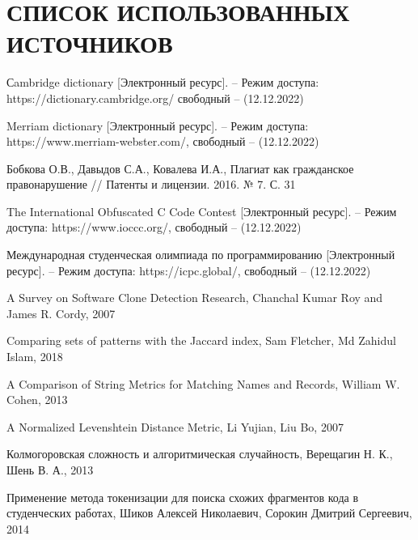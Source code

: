 \section*{СПИСОК ИСПОЛЬЗОВАННЫХ ИСТОЧНИКОВ}

\begingroup
\renewcommand{\section}[2]{}
\begin{thebibliography}{}
	
	
	Сambridge dictionary  [Электронный ресурс]. -- Режим доступа: 
	https://dictionary.cambridge.org/
	свободный -- (12.12.2022)
	
	Merriam dictionary [Электронный ресурс]. -- Режим доступа: 
	https://www.merriam-webster.com/,
	свободный -- (12.12.2022)
	
	Бобкова О.В., Давыдов С.А., Ковалева И.А., 
	Плагиат как гражданское правонарушение //
	Патенты и лицензии. 2016. № 7. С. 31
	
	
	The International Obfuscated C Code Contest  [Электронный ресурс]. -- Режим доступа: 
	https://www.ioccc.org/,
	свободный -- (12.12.2022)
	
	
	Международная студенческая олимпиада по программированию [Электронный ресурс]. -- Режим доступа: 
	https://icpc.global/,
	свободный -- (12.12.2022)
	
	A Survey on Software Clone Detection Research,
	Chanchal Kumar Roy and James R. Cordy,
	2007
	
	
	Comparing sets of patterns with the Jaccard index,
	Sam Fletcher, Md Zahidul Islam,
	2018
	
	A Comparison of String Metrics for Matching Names and Records,
	William W. Cohen,
	2013
	
	A Normalized Levenshtein Distance Metric,
	Li Yujian, Liu Bo,
	2007
	
	
	 Колмогоровская сложность и алгоритмическая случайность,
	 Верещагин Н. К., Шень В. А.,
	 2013	
	
	Применение метода токенизации для поиска схожих фрагментов кода в студенческих работах,
	Шиков Алексей Николаевич, Сорокин Дмитрий Сергеевич,
	2014
	

\end{thebibliography}
